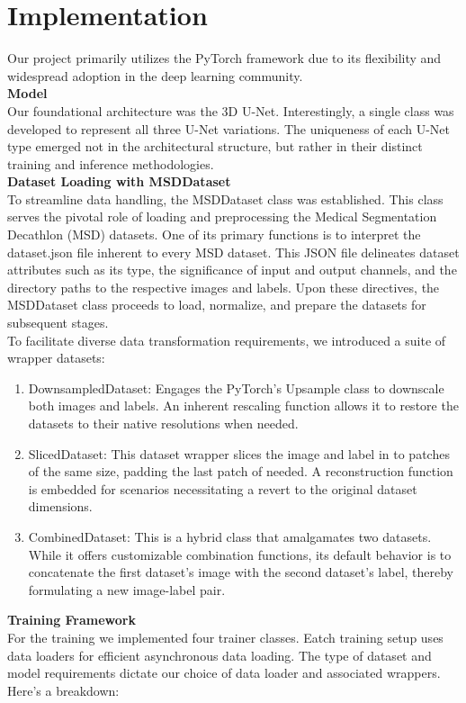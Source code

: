 \chapter{Implementation}
Our project primarily utilizes the PyTorch framework due to its flexibility and widespread adoption in the deep learning community.\\[1ex]
\textbf{Model}\\
Our foundational architecture was the 3D U-Net. Interestingly, a single class was developed to represent all three U-Net variations. The uniqueness of each U-Net type emerged not in the architectural structure,
but rather in their distinct training and inference methodologies.\\[1ex]
\textbf{Dataset Loading with MSDDataset}\\
To streamline data handling, the MSDDataset class was established. This class serves the pivotal role of loading and preprocessing the Medical Segmentation Decathlon (MSD) datasets.
One of its primary functions is to interpret the dataset.json file inherent to every MSD dataset. This JSON file delineates dataset attributes such as its type, the significance of input and output channels,
and the directory paths to the respective images and labels. Upon these directives, the MSDDataset class proceeds to load, normalize, and prepare the datasets for subsequent stages.\\
To facilitate diverse data transformation requirements, we introduced a suite of wrapper datasets:
\begin{enumerate}
	\item DownsampledDataset: Engages the PyTorch's Upsample class to downscale both images and labels. An inherent rescaling function allows it to restore the datasets to their native resolutions when needed.
	\item SlicedDataset: This dataset wrapper slices the image and label in to patches of the same size, padding the last patch of needed.
	A reconstruction function is embedded for scenarios necessitating a revert to the original dataset dimensions.
	\item CombinedDataset: This is a hybrid class that amalgamates two datasets. While it offers customizable combination functions,
	its default behavior is to concatenate the first dataset's image with the second dataset's label, thereby formulating a new image-label pair.
\end{enumerate}

\noindent\textbf{Training Framework}\\
For the training we implemented four trainer classes. Eatch training setup uses data loaders for efficient asynchronous data loading.
The type of dataset and model requirements dictate our choice of data loader and associated wrappers. Here's a breakdown:

